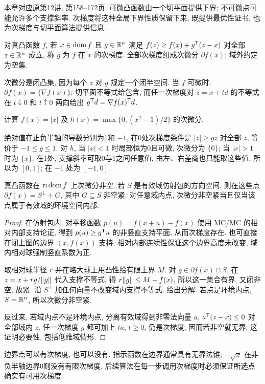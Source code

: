 \label{chap:5}
本章对应原第12讲, 第158--172页. 可微凸函数由一个切平面提供下界; 不可微点可能允许多个支撑斜率. 次梯度将这种全局下界性质保留下来, 既提供最优性证书, 也为次梯度与切平面算法提供信息.

\begin{definition}
对真凸函数 $f$, 若 $x\in\operatorname{dom} f$ 且 $g\in\mathbb R^n$ 满足 $f(z)\ge f(x)+g^{\mathsf T}(z-x)$ 对全部 $z\in\mathbb R^n$ 成立, 称 $g$ 为 $f$ 在 $x$ 的次梯度. 全部次梯度组成次微分 $\partial f(x)$; 域外约定为空集.
\end{definition}
次微分是闭凸集, 因为每个 $z$ 对 $g$ 规定一个闭半空间. 当 $f$ 可微时, $\partial f(x)=\{\nabla f(x)\}$: 切平面不等式给包含, 而任一次梯度对 $z=x+td$ 的不等式在 $t\downarrow0$ 和 $t\uparrow0$ 两向给出 $g^{\mathsf T} d=\nabla f(x)^{\mathsf T} d$.

\begin{example}
计算 $f(x)=|x|$ 及 $h(x)=\max\{0,(x^2-1)/2\}$ 的次微分.
\end{example}
\begin{solution}
绝对值在正负半轴的导数分别为1和 $-1$, 在0处次梯度条件是 $|z|\ge gz$ 对全部 $z$, 等价于 $-1\le g\le1$. 对 $h$, 当 $|x|<1$ 时局部恒为0且可微, 次微分为 $\{0\}$; 当 $|x|>1$ 时为 $\{x\}$. 在1处, 支撑斜率可取0与1之间任意值, 由左、右差商也只能取这些值, 所以为 $[0,1]$; 在 $-1$ 处为 $[-1,0]$.
\end{solution}
\begin{theorem}\label{thm:subgrad-exists}
真凸函数在 $\operatorname{ri}\operatorname{dom} f$ 上次微分非空. 若 $S$ 是有效域仿射包的方向空间, 则在这些点 $\partial f(x)=S^\perp+G$, 其中 $G\subseteq S$ 非空紧. 对任意域内点, 次微分非空紧当且仅当该点属于有效域的环境空间内部.
\end{theorem}
\begin{proof}
在仿射包内, 对平移函数 $p(u)=f(x+u)-f(x)$ 使用 MC/MC 的相对内部支持论证, 得到 $p(u)\ge g^{\mathsf T} u$ 的非竖直支持平面, 从而次梯度存在. 也可直接在闭上图的边界 $(x,f(x))$ 支持; 相对内部连续性保证这个边界高度未改变, 域内相对球强制竖直系数为正.

取相对球半径 $r$ 并在略大球上用凸性给有限上界 $M$. 对 $g\in\partial f(x)\cap S$, 在 $z=x+r g/\lVert g\rVert$ 代入支撑不等式, 得 $r\lVert g\rVert\le M-f(x)$, 所以这一集合有界, 又闭非空, 故紧. 沿 $S^\perp$ 加任何向量不改变域内支撑不等式, 给出分解. 若点是环境内点, $S=\mathbb R^n$, 所以次微分非空紧.

反过来, 若域内点不是环境内点, 分离有效域得到非零法向量 $a$, $a^{\mathsf T}(z-x)\le0$ 对全部域内 $z$. 任一次梯度 $g$ 都可加上 $ta$, $t\ge0$, 仍是次梯度, 因而若非空就无界. 这证明必要性, 包括低维域情形.
\end{proof}
边界点可以有次梯度, 也可以没有. 指示函数在边界通常具有无界法锥; $-\sqrt x$ 在非负半轴边界0则没有有限次梯度. 后续算法在每一步调用次梯度时必须保证所选点确实有可用次梯度.

